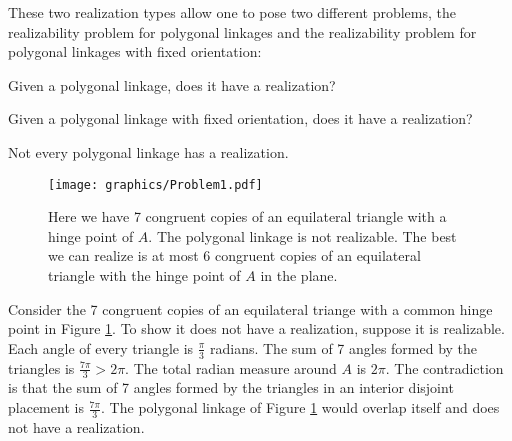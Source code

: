 These two realization types allow one to pose two different problems, the realizability problem for polygonal linkages and the realizability problem for polygonal linkages with fixed orientation:
\begin{prob}\label{problem:UnorderedPolygonal}
Given a polygonal linkage, does it have a realization?
\end{prob}
\begin{prob}\label{problem:OrderedPolygonal}
Given a polygonal linkage with fixed orientation, does it have a realization?
\end{prob}
Not every polygonal linkage has a realization.
\begin{figure}[!htbp]
\begin{center}
\texttt{[image: graphics/Problem1.pdf]}
\end{center} 
\caption{Here we have 7 congruent copies of an equilateral triangle with a hinge point of $A$.  The polygonal linkage is not realizable.  The best we can realize is at most 6 congruent copies of an equilateral triangle with the hinge point of $A$ in the plane.}
\label{fig:problem1}
\end{figure}
Consider the 7 congruent copies of an equilateral triange with a common hinge point in Figure \ref{fig:problem1}.
To show it does not have a realization, suppose it is realizable.  
Each angle of every triangle is $\frac{\pi}{3}$ radians.  
The sum of 7 angles formed by the triangles is $\frac{7\pi}{3}>2\pi$.  
The total radian measure around $A$ is $2 \pi$.
The contradiction is that the sum of 7 angles formed by the triangles in an interior disjoint placement is $\frac{7\pi}{3}$.
The polygonal linkage of Figure \ref{fig:problem1} would overlap itself and does not have a realization.

